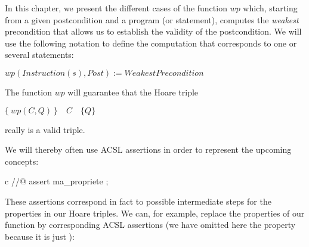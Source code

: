 In this chapter, we present the different cases of the function $wp$
which, starting from a given postcondition and a program (or statement),
computes the \emph{weakest} precondition that allows us to establish the
validity of the postcondition. We will use the following notation to
define the computation that corresponds to one or several statements:



$wp(Instruction(s), Post) := WeakestPrecondition$



The function \(wp\) will guarantee that the Hoare triple




\begin{center}
$\{\ wp(C,Q)\ \}\quad C\quad \{ Q \}$


\end{center}


really is a valid triple.



We will thereby often use ACSL assertions in order to represent the
upcoming concepts:



\begin{CodeBlock}{c}
//@ assert ma_propriete ;
\end{CodeBlock}



These assertions correspond in fact to possible intermediate steps for
the properties in our Hoare triples. We can, for example, replace the
properties of our function  by corresponding ACSL assertions
(we have omitted here the property  because it is just
):



